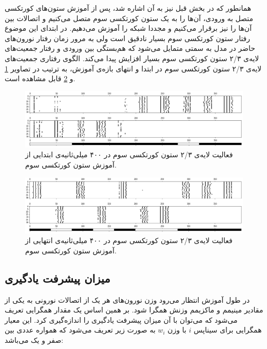 \documentclass[12pt]{report}
\begin{document}
	همانطور که در بخش قبل‌ نیز به آن اشاره شد، پس از آموزش ستون‌های کورتکسی متصل به ورودی، آن‌ها را به یک ستون کورتکسی سوم متصل می‌کنیم و اتصالات بین آن‌ها را نیز برقرار می‌کنیم و مجددا شبکه را آموزش می‌دهیم. در ابتدای این موضوع رفتار ستون کورتکسی سوم بسیار نادقیق است ولی به مرور زمان رفتار نورون‌های حاضر در مدل به سمتی متمایل می‌شود که هم‌بستگی بین ورودی و رفتار جمعیت‌های لایه‌ی ۲/۳ ستون کورتکسی سوم بسیار افزایش پیدا می‌کند. الگوی رفتاری جمعیت‌های لایه‌ی ۲/۳ ستون کورتکسی سوم در ابتدا و انتهای بازه‌ی آموزش، به ترتیب در تصاویر ‌\ref{fig:c3-begining} و \ref{fig:c3-final} قابل مشاهده است.
	
	\begin{figure}[H]
		\centering
		\includegraphics[width=1.0\linewidth]{c3-begining.png}
		\caption[NS]{
			فعالیت لایه‌ی ۲/۳ ستون کورتکسی سوم در ۴۰۰ میلی‌ثانیه‌ی ابتدایی از آموزش ستون کورتکسی سوم.
		}
		\label{fig:c3-begining} 
	\end{figure}

\begin{figure}[H]
	\centering
	\includegraphics[width=1.0\linewidth]{c3-final.png}
	\caption[NS]{
	فعالیت لایه‌ی ۲/۳ ستون کورتکسی سوم در ۴۰۰ میلی‌ثانیه‌ی انتهایی از آموزش ستون کورتکسی سوم.
	}
	\label{fig:c3-final} 
\end{figure}
	
	\subsection{میزان پیشرفت یادگیری}
	
	در طول آموزش انتظار می‌رود وزن نورون‌های هر یک از اتصالات نورونی به یکی از مقادیر مینیمم و ماکزیمم وزنش همگرا شود. بر همین اساس یک مقدار همگرایی تعریف می‌شود که می‌توان با آن میزان پیشرفت یادگیری را اندازه‌گیری کرد. این معیار همگرایی برای سیناپس $i$ با وزن $w_i$ به صورت زیر تعریف می‌شود که همواره عددی بین صفر و یک می‌باشد:
	
\end{document}
